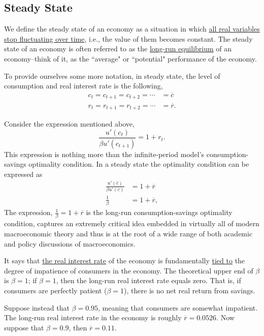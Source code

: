 \documentclass[10pt]{article}
\begin{document}
\subsection{Steady State}

We define the steady state of an economy as a situation in which 
{\underline {all real variables stop fluctuating over time}},
i.e., the value of them becomes constant.
The steady state of an economy is often referred to as the {\underline {long-run equilibrium}}
of an economy--think of it, as the ``average" or ``potential" performance of the economy.

To provide ourselves some more notation, in steady state, the level of consumption and real
interest rate is the following,
\begin{align*}
c_{t} = c_{t + 1} = c_{t + 2} = \cdots &=  \overline{c}\\
r_{t} = r_{t + 1} = r_{t + 2} = \cdots &=  \overline{r}.
\end{align*}

Consider the expression mentioned above,
\begin{equation*}
		\frac{u'(c_{t})}{\beta u'(c_{t + 1})} = 1 + r_{t}.
\end{equation*}
This expression is nothing more than the infinite-period model's consumption-savings optimality
condition. In a steady state the optimality condition can be expressed as
\begin{align*}
		\frac{u'( \overline{c})}{\beta u'( \overline{c})} &= 1 +  \overline{r}\\
		\frac{1}{\beta} &= 1 +  \overline{r},
\end{align*}
The expression, $ \frac{1}{\beta} = 1 +  \overline{r} $ is the long-run consumption-savings
optimality condition, captures an extremely critical idea embedded in virtually all of modern
macroeconomic theory and thus is at the root of a wide range of both academic and policy discussions
of macroeconomics.


It says that {\underline {the real interest rate}} of the economy is fundamentally {\underline {tied
to}} the degree of impatience of consumers in the economy. The theoretical upper end of $ \beta $
is $ \beta = 1 $; if $ \beta = 1 $, then the long-run real interest rate equals zero. That is,
if consumers are perfectly patient ($ \beta = 1 $), there is no net real return from savings.

Suppose instead that $ \beta = 0.95 $, meaning that consumers are somewhat impatient. The long-run
real interest rate in the economy is roughly $  \overline{r} = 0.0526 $. Now suppose that
$ \beta = 0.9 $, then $  \overline{r} = 0.11 $.
\end{document}
